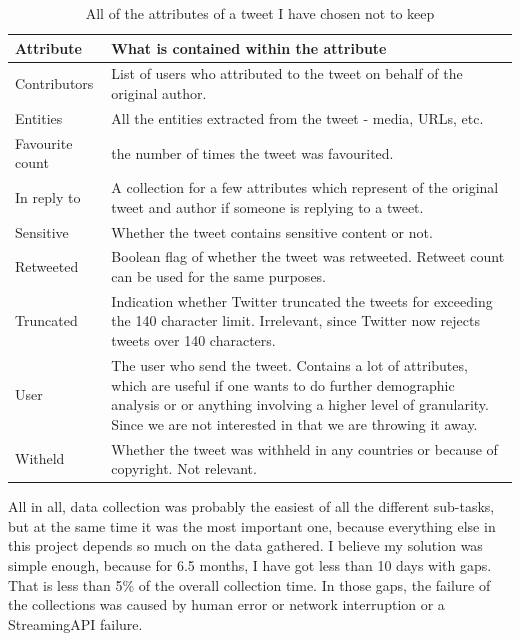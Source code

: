 \documentclass[minf,twoside,singlespacing,parskip,frontabs,notimes,11pt]{infthesis}
\begin{document}
\begin{table}[]
\begin{center}
\begin{tabular}{ l | p{11cm} }
\textbf{Attribute} & \textbf{What is contained within the attribute} \\
\hline
\hline
Contributors & List of users who attributed to the tweet on behalf of the original author.\\
\hline
Entities & All the entities extracted from the tweet - media, URLs, etc. \\
\hline
Favourite count & the number of times the tweet was favourited. \\
\hline
In reply to & A collection for a few attributes which represent of the original tweet and author if someone is replying to a tweet.  \\
\hline
Sensitive & Whether the tweet contains sensitive content or not. \\
\hline
Retweeted & Boolean flag of whether the tweet was retweeted. Retweet count can be used for the same purposes.  \\
\hline
Truncated &  Indication whether Twitter truncated the tweets for exceeding the 140 character limit. Irrelevant, since Twitter now rejects tweets over 140 characters.\\
\hline
User & The user who send the tweet. Contains a lot of attributes, which are useful if one wants to do further demographic analysis or or anything involving a higher level of granularity. Since we are not interested in that we are throwing it away.\\
\hline
Witheld & Whether the tweet was withheld in any countries or because of copyright. Not relevant. \\
\end{tabular}
\end{center}
\caption{All of the attributes of a tweet I have chosen not to keep }
\label{thrown}
\end{table}


All in all, data collection was probably the easiest of all the different sub-tasks, but at the same time it was the most important one, because everything else in this project depends so much on the data gathered. I believe my solution was simple enough, because for 6.5 months, I have got less than 10 days with gaps. That is less than 5\% of the overall collection time. In those gaps, the failure of the collections was caused by human error or network interruption or a StreamingAPI failure. 
\end{document}
